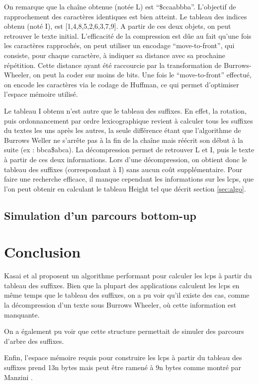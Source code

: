 \documentclass[a4paper,10pt]{article}
\begin{document}
On remarque que la chaîne obtenue (notée L) est
``\$ccaabbba''. L'objectif de rapprochement des caractères identiques
est bien atteint. Le tableau des indices obtenu (noté I), est
[1,4,8,5,2,6,3,7,9]. A partir de ces deux objets, on peut retrouver le
texte initial. L'efficacité de la compression est dûe au fait qu'une
fois les caractères rapprochés, on peut utiliser un encodage
``move-to-front'', qui consiste, pour chaque caractère, à indiquer sa
distance avec sa prochaine répétition. Cette distance ayant été
raccourcie par la transformation de Burrows-Wheeler, on peut la coder
sur moins de bits. Une fois le ``move-to-front'' effectué, on encode
les caractères via le codage de Huffman, ce qui permet d'optimiser
l'espace mémoire utilisé.

Le tableau I obtenu n'est autre que le tableau des suffixes. En effet,
la rotation, puis ordonnancement par ordre lexicographique revient à
calculer tous les suffixes du textes les uns après les autres, la
seule différence étant que l'algorithme de Burrows Weller ne s'arrête
pas à la fin de la chaîne mais réécrit son début à la suite (ex :
bbca\$abca). La décompression permet de retrouver L et I, puis le
texte à partir de ces deux informations. Lors d'une décompression, on
obtient donc le tableau des suffixes (correspondant à I) sans aucun
coût supplémentaire. Pour faire une recherche efficace, il manque
cependant les informations sur les lcps, que l'on peut obtenir en
calculant le tableau Height tel que décrit section \ref{sec:algo}.


\subsection{Simulation d'un parcours bottom-up}
\label{sec:bottomup}


\section{Conclusion}
\label{sec:conclusion}


Kasai et al proposent un algorithme performant pour calculer les lcps
à partir du tableau des suffixes. Bien que la plupart des applications
calculent les lcps en même temps que le tableau des suffixes, on a pu
voir qu'il existe des cas, comme la décompression d'un texte sous
Burrows Wheeler, où cette information est manquante.

On a également pu voir que cette structure permettait de simuler des
parcours d'arbre des suffixes.

Enfin, l'espace mémoire requis pour construire les lcps à partir du
tableau des suffixes prend 13n bytes mais peut être ramené à 9n bytes
comme montré par Manzini \cite{Manzini04}.




\end{document}

